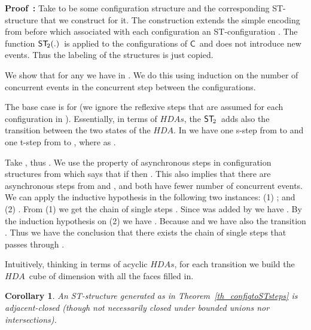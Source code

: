 \documentclass[submission,copyright,creativecommons]{eptcs}
\newtheorem{corollary}[theorem]{Corollary}
\newenvironment{proof}[1][\!\!\,]{\vspace{1ex}\noindent\textbf{Proof #1: }}{\hfill\vspace{2ex}}
\newcounter{case}
\newcommand\HDA{\ensuremath{\mathit{HDA}}}
\newcommand\HDAs{\ensuremath{\mathit{HDAs}}}
\newcommand\C{\ensuremath{\mathsf{C}}}
\newcommand\cintostSecond{\ensuremath{\mathsf{ST}_{\hspace{-0.4ex}2}}}
\newcommand\STofC[1]{\ensuremath{\cintostSecond(#1)}}
\begin{document}
\begin{proof}
Take  to be some configuration structure and  the corresponding ST-structure that we construct for it.
The construction extends the simple encoding from before which associated with each configuration  an ST-configuration . 
The function \STofC{.}\ is applied to the configurations of \C\ and does not introduce new events. Thus the labeling of the structures is just copied.

We show that for any  we have  in . We do this using induction on the number of concurrent events in the concurrent step between the configurations. 

The base case is for  (we ignore the reflexive steps that are assumed for each configuration in \cite{GlabbeekP09configStruct}).
Essentially, in terms of \HDAs, the \cintostSecond\ adds also the transition between the two states of the \HDA. 
In  we have one s-step from  to  and one t-step from  to , where  as .

Take , thus . 
We use the property of asynchronous steps in configuration structures from \cite[Def.2.1]{GlabbeekP09configStruct} which says that if  then . This also implies that there are asynchronous steps from  and , and both have fewer number of concurrent events. 
We can apply the inductive hypothesis in the following two instances:
(1) ; and (2) . From (1) we get the chain of single steps . Since  was added by  we have . By the induction hypothesis on (2) we have . 
Because  and  we have also the transition .
Thus we have the conclusion that there exists the chain of single steps  that passes through .

Intuitively, thinking in terms of acyclic \HDAs, for each transition  we build the \HDA\ cube of dimension  with all the faces filled in.
\end{proof}


\begin{corollary}\label{cor_adjacent}
An ST-structure  generated as in Theorem~\ref{th_configtoSTsteps} is adja\-cent-closed (though not necessarily closed under bounded unions nor intersections).
\end{corollary}
\end{document}
